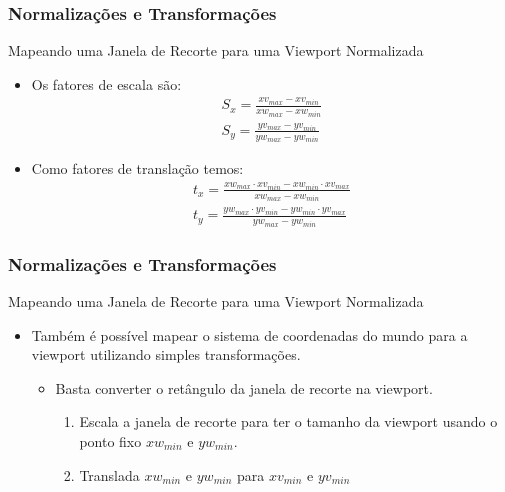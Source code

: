 \documentclass{beamer}
\begin{document}
\begin{frame}
\frametitle{Normalizações e Transformações }

	\begin{block}{Mapeando uma Janela de Recorte para uma Viewport Normalizada}
		\begin{itemize}
			\item Os fatores de escala são:
				\begin{eqnarray*}
					S_x = \frac{xv_{max} - xv_{min}}{xw_{max} - xw_{min}} \\
					S_y = \frac{yv_{max} - yv_{min}}{yw_{max} - yw_{min}}
				\end{eqnarray*}
				
			\item Como fatores de translação temos:
				\begin{eqnarray*}
					t_x = \frac{xw_{max} \cdot xv_{min} - xw_{min} \cdot xv_{max}}{xw_{max} - xw_{min}} \\
					t_y = \frac{yw_{max} \cdot yv_{min} - yw_{min} \cdot yv_{max}}{yw_{max} - yw_{min}}
				\end{eqnarray*}		 	 
		\end{itemize}	
	\end{block}
	
\end{frame}

\begin{frame}
\frametitle{Normalizações e Transformações }

	\begin{block}{Mapeando uma Janela de Recorte para uma Viewport Normalizada}
		\begin{itemize}
			\item Também é possível mapear o sistema de coordenadas do mundo para a viewport utilizando simples transformações.
				\begin{itemize}
					\item Basta converter o retângulo da janela de recorte na viewport.
					\begin{enumerate}
					\item Escala a janela de recorte para ter o tamanho da viewport usando o ponto fixo $xw_{min}$ e $yw_{min}$.
					\item Translada $xw_{min}$ e $yw_{min}$ para $xv_{min}$ e $yv_{min}$
				\end{enumerate}				
				\end{itemize}
													 	 
		\end{itemize}	
	\end{block}
	
\end{frame}
\end{document}
